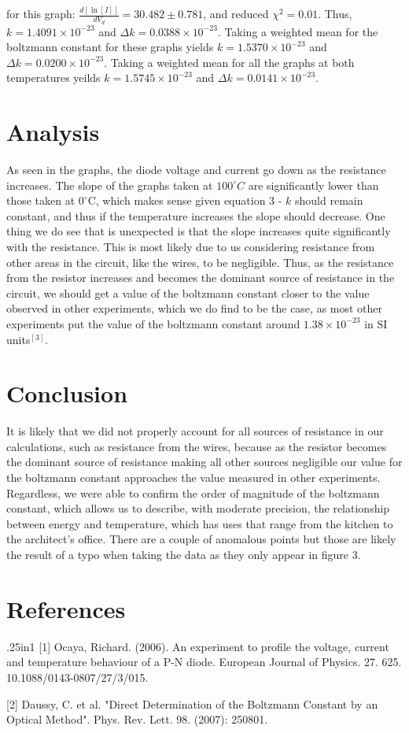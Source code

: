 \documentclass[12pt, a4paper]{article}
\begin{document}
	for this graph: $\frac{d[\ln [I]]}{dV_d} = 30.482 \pm 0.781$, and reduced $\chi^2 = 0.01$. Thus, $k = 1.4091 \times 10^{-23}$ and $\Delta k = 0.0388 \times 10^{-23}$.
	\linebreak
	\linebreak
	Taking a weighted mean for the boltzmann constant for these graphs yields $k = 1.5370 \times 10^{-23}$ and $\Delta k = 0.0200 \times 10^{-23}$. Taking a weighted mean for all the graphs at both temperatures yeilds $k = 1.5745 \times 10^{-23}$ and $\Delta k = 0.0141 \times 10^{-23}$.

\section{Analysis}
	As seen in the graphs, the diode voltage and current go down as the resistance increases. The slope of the graphs taken at $100^{\circ}C$ are significantly lower than those taken at $0^{\circ}$C, which makes sense given equation 3 - $k$ should remain constant, and thus if the temperature increases the slope should decrease. One thing we do see that is unexpected is that the slope increases quite significantly with the resistance. This is most likely due to us considering resistance from other areas in the circuit, like the wires, to be negligible. Thus, as the resistance from the resistor increases and becomes the dominant source of resistance in the circuit, we should get a value of the boltzmann constant closer to the value observed in other experiments, which we do find to be the case, as most other experiments put the value of the boltzmann constant around $1.38 \times 10^{-23}$ in SI units$^{[3]}$. 

\section{Conclusion}
	It is likely that we did not properly account for all sources of resistance in our calculations, such as resistance from the wires, because as the resistor becomes the dominant source of resistance making all other sources negligible our value for the boltzmann constant approaches the value measured in other experiments. Regardless, we were able to confirm the order of magnitude of the boltzmann constant, which allows us to describe, with moderate precision, the relationship between energy and temperature, which has uses that range from the kitchen to the architect's office. There are a couple of anomalous points but those are likely the result of a typo when taking the data as they only appear in figure 3. 

\section*{References}

	\begin{hangparas}{.25in}{1}
		[1] Ocaya, Richard. (2006). An experiment to profile the voltage, current and temperature behaviour of a P-N diode. European Journal of Physics. 27. 625. 10.1088/0143-0807/27/3/015.
		
		[2] Daussy, C. et al. "Direct Determination of the Boltzmann Constant by an Optical Method". Phys. Rev. Lett. 98. (2007): 250801.
	\end{hangparas}
\end{document}
